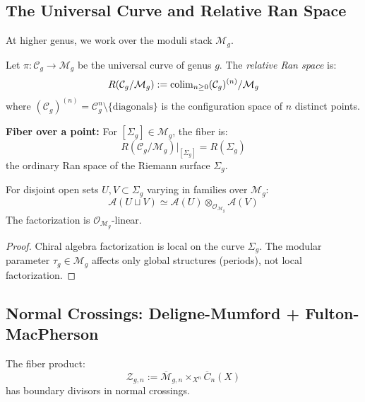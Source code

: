 \subsection{The Universal Curve and Relative Ran Space}
\label{subsec:universal-curve-ran}

At higher genus, we work over the moduli stack $\mathcal{M}_g$.

\begin{construction}\label{const:relative-ran}
Let $\pi: \mathcal{C}_g \to \mathcal{M}_g$ be the universal curve of genus $g$. The \emph{relative Ran space} is:
$$R(\mathcal{C}_g/\mathcal{M}_g) := \operatorname{colim}_{n \geq 0} (\mathcal{C}_g)^{(n)}/\mathcal{M}_g$$
where $(\mathcal{C}_g)^{(n)} = \mathcal{C}_g^n \setminus \{\text{diagonals}\}$ is the configuration space of $n$ distinct points.

\textbf{Fiber over a point:} For $[\Sigma_g] \in \mathcal{M}_g$, the fiber is:
$$R(\mathcal{C}_g/\mathcal{M}_g)|_{[\Sigma_g]} = R(\Sigma_g)$$
the ordinary Ran space of the Riemann surface $\Sigma_g$.
\end{construction}

\begin{proposition}\label{prop:factorization-over-moduli}
For disjoint open sets $U, V \subset \Sigma_g$ varying in families over $\mathcal{M}_g$:
$$\mathcal{A}(U \sqcup V) \simeq \mathcal{A}(U) \otimes_{\mathcal{O}_{\mathcal{M}_g}} \mathcal{A}(V)$$
The factorization is $\mathcal{O}_{\mathcal{M}_g}$-linear.
\end{proposition}

\begin{proof}
Chiral algebra factorization is local on the curve $\Sigma_g$. The modular parameter $\tau_g \in \mathcal{M}_g$ affects only global structures (periods), not local factorization.
\end{proof}

\subsection{Normal Crossings: Deligne-Mumford + Fulton-MacPherson}
\label{subsec:normal-crossings-combined}

\begin{theorem}\label{thm:normal-crossings-persist}
The fiber product:
$$\mathcal{Z}_{g,n} := \overline{\mathcal{M}}_{g,n} \times_{X^n} \overline{C}_n(X)$$
has boundary divisors in normal crossings.
\end{theorem}

